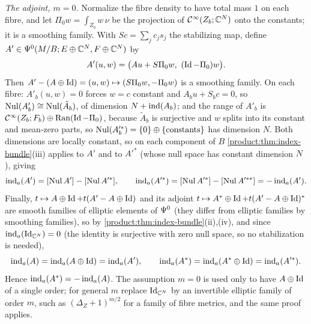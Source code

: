\emph{The adjoint, $m=0$.} Normalize the fibre density to have total mass $1$ on each
fibre, and let $\Pi_0w=\int_{Z_b}w\,\nu$ be the projection of $\mathcal{C}^\infty(Z_b;\mathbb{C}^N)$ onto the
constants; it is a smoothing family. With $S c=\sum_jc_js_j$ the stabilizing map,
define $A'\in\Psi^{0}(M/B;E\oplus\mathbb{C}^N,F\oplus\mathbb{C}^N)$ by
\begin{equation*}
A'(u,w)=\big(Au+S\Pi_0w,\ (\Id-\Pi_0)w\big).
\end{equation*}
Then $A'-(A\oplus\operatorname{Id})=(u,w)\mapsto(S\Pi_0w,-\Pi_0w)$ is a smoothing family. On each
fibre: $A'_b(u,w)=0$ forces $w=c$ constant and $A_bu+S_bc=0$, so
$\operatorname{Nul}(A'_b)\cong\operatorname{Nul}(\tilde A_b)$, of dimension $N+\operatorname{ind}(A_b)$; and the range of $A'_b$
is $\mathcal{C}^\infty(Z_b;F_b)\oplus\operatorname{Ran}(\operatorname{Id}-\Pi_0)$, because $\tilde A_b$ is surjective and $w$ splits
into its constant and mean-zero parts, so $\operatorname{Nul}(A'^*_b)=\{0\}\oplus\{\text{constants}\}$
has dimension $N$. Both dimensions are locally constant, so on each component of $B$
\cref{product:thm:index-bundle}(iii) applies to $A'$ and to $A'^*$ (whose null space has
constant dimension $N$), giving
\begin{equation*}
\operatorname{ind}_a(A')=[\operatorname{Nul} A']-[\operatorname{Nul} A'^*],\qquad\operatorname{ind}_a(A'^*)=[\operatorname{Nul} A'^*]-[\operatorname{Nul} A'^{**}]=-\operatorname{ind}_a(A').
\end{equation*}
Finally, $t\mapsto A\oplus\operatorname{Id}+t(A'-A\oplus\operatorname{Id})$ and its adjoint
$t\mapsto A^*\oplus\operatorname{Id}+t(A'-A\oplus\operatorname{Id})^*$ are smooth families of elliptic elements of
$\Psi^{0}$ (they differ from elliptic families by smoothing families), so by
\cref{product:thm:index-bundle}(ii),(iv), and since $\operatorname{ind}_a(\operatorname{Id}_{\mathbb{C}^N})=0$ (the
identity is surjective with zero null space, so no stabilization is needed),
\begin{equation*}
\operatorname{ind}_a(A)=\operatorname{ind}_a(A\oplus\operatorname{Id})=\operatorname{ind}_a(A'),\qquad\operatorname{ind}_a(A^*)=\operatorname{ind}_a(A^*\oplus\operatorname{Id})=\operatorname{ind}_a(A'^*).
\end{equation*}
Hence $\operatorname{ind}_a(A^*)=-\operatorname{ind}_a(A)$. The assumption $m=0$ is used only to have $A\oplus\operatorname{Id}$
of a single order; for general $m$ replace $\operatorname{Id}_{\mathbb{C}^N}$ by an invertible elliptic
family of order $m$, such as $(\Delta_{Z}+1)^{m/2}$ for a family of fibre metrics, and
the same proof applies.
